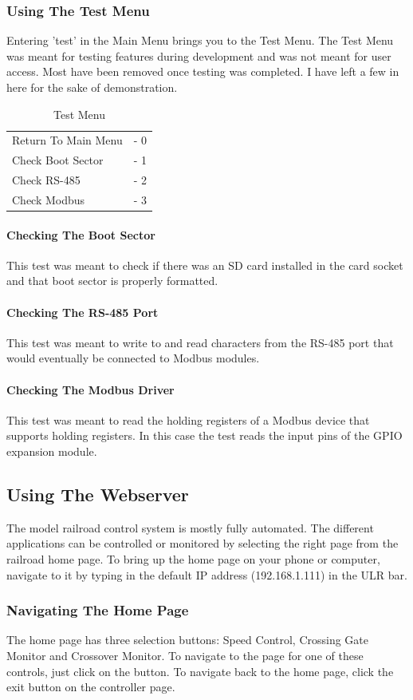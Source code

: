 \documentclass[acmlarge,screen]{acmart}
\begin{document}
\subsubsection{Using The Test Menu}
Entering 'test' in the Main Menu brings you to the Test Menu. The Test Menu was meant for testing features during development and was not meant for user access. Most have been removed once testing was completed. I have left a few in here for the sake of demonstration.
\begin{table}[H]
\begin{tabular}{l l} 
Return To Main Menu & - 0\\
Check Boot Sector & - 1\\
Check RS-485 & - 2\\
Check Modbus & - 3\\
\end{tabular} 
\caption{Test Menu}
\end{table}
\paragraph{Checking The Boot Sector}
This test was meant to check if there was an SD card installed in the card socket and that boot sector is properly formatted.
\paragraph{Checking The RS-485 Port}
This test was meant to write to and read characters from the RS-485 port that would eventually be connected to Modbus modules.
\paragraph{Checking The Modbus Driver}
This test was meant to read the holding registers of a Modbus device that supports holding registers. In this case the test reads the input pins of the GPIO expansion module.
\subsection{Using The Webserver}
The model railroad control system is mostly fully automated. The different applications can be controlled or monitored by selecting the right page from the railroad home page. To bring up the home page on your phone or computer, navigate to it by typing in the default IP address (192.168.1.111) in the ULR bar.
\subsubsection{Navigating The Home Page}
The home page has three selection buttons: Speed Control, Crossing Gate Monitor and Crossover Monitor. To navigate to the page for one of these controls, just click on the button. To navigate back to the home page, click the exit button on the controller page.
\end{document}
